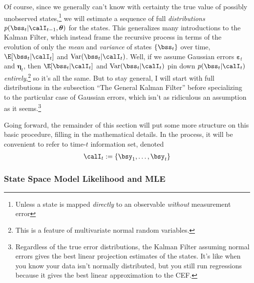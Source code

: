 \documentclass[12pt]{article}
\theoremstyle{plain}
\theoremstyle{definition}
\theoremstyle{remark}
\newcommand{\bseta}{\boldsymbol{\eta}}
\newcommand{\bstheta}{\boldsymbol{\theta}}
\newcommand{\bsvarepsilon}{\boldsymbol{\varepsilon}}
\begin{document}
Of course, since we generally can't know with certainty the true value
of possibly unobserved states,\footnote{%
  Unless a state is mapped \emph{directly} to an observable
  \emph{without} measurement error
}
we will estimate a sequence of full \emph{distributions}
$p(\bss_{t}|\calI_{t-1},\bstheta)$ for
the states.
This generalizes many introductions to the Kalman Filter,
which instead frame the recursive process in terms of the evolution of
only the \emph{mean} and \emph{variance} of states $\{\bss_t\}$ over
time, $\E[\bss_t|\calI_t]$ and $\text{Var}(\bss_t|\calI_t)$.
Well, if we assume Gaussian errors $\bsvarepsilon_t$ and $\bseta_t$,
then $\E[\bss_t|\calI_t]$ and $\text{Var}(\bss_t|\calI_t)$ pin down
$p(\bss_t|\calI_t)$ \emph{entirely},\footnote{%
  This is a feature of multivariate normal random variables.
}
so it's all the same. But to stay general, I will start with full
distributions in the subsection ``The General Kalman Filter''
before specializing to the particular case of Gaussian errors, which
isn't as ridiculous an assumption as it seems.\footnote{%
  Regardless of the true error distributions, the Kalman Filter assuming
  normal errors gives the best linear projection estimates of the
  states. It's like when you know your data isn't normally distributed,
  but you still run regressions because it gives the best linear
  approximation to the CEF.
}

Going forward, the remainder of this section will put some more
structure on this basic procedure, filling in the mathematical details.
In the process, it will be convenient to refer to time-$t$ information
set, denoted
\begin{align*}
  \calI_t := \{\bsy_1,\ldots,\bsy_t\}
\end{align*}



\subsubsection{State Space Model Likelihood and MLE}
\end{document}
